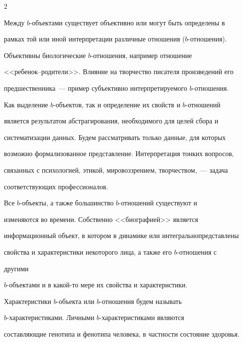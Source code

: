 \begin{multicols}{2}
\begin{itemize}
\end{itemize}





  Между $b$-объектами существует объективно или могут быть определены в 


рамках той или иной интерпретации различные отношения ($b$-отношения). 


Объективны биологические $b$-отношения, например отношение 


  <<ребенок--родители>>. Влияние на творчество писателя произведений его 


пред\-ше\-ст\-вен\-ни\-ка~--- пример субъективно интер\-пре\-ти\-ру\-емо\-го $b$-отношения.


  


  Как выделение $b$-объектов, так и определение их свойств и $b$-отношений 


является результатом абстрагирования, необходимого для целей сбора и 


сис\-те\-ма\-ти\-за\-ции данных. Будем рассматривать только данные, для которых 


возможно формализованное представление. Интерпретация тонких вопросов, 


связанных с психологией, этикой, мировоззрением, творчеством,~--- задача 


соответствующих профессионалов.


  


  Все $b$-объекты, а также большинство $b$-от\-но\-ше\-ний существуют и 


изменяются во времени. Собственно <<биографией>> является 


информационный объект, в котором в динамике или интегрально\linebreak представлены 


свойства и характеристики некоторого лица, а также его $b$-отношения с 


другими\linebreak


 $b$-объек\-та\-ми и в какой-то мере их свойства и характеристики. 


Характеристики $b$-объек\-та или $b$-от\-но\-ше\-ния будем называть 


  $b$-ха\-рак\-те\-ри\-сти\-ка\-ми. Личными $b$-ха\-рак\-те\-ри\-сти\-ка\-ми являются 


составляющие генотипа и фенотипа человека, в частности состояние здоровья. 



\end{multicols}
